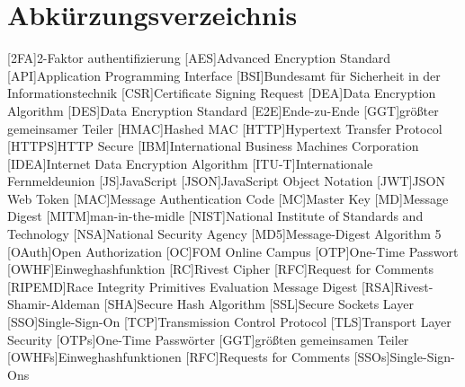 \section*{Abkürzungsverzeichnis}


\begin{acronym}
	[HTTPS]\itemsep0pt %
    [2FA]{2-Faktor \gls{authentifizierung}}
    [AES]{Advanced Encryption Standard}
    [API]{Application Programming Interface}
    [BSI]{Bundesamt für Sicherheit in der Informationstechnik}
    [CSR]{Certificate Signing Request}
    [DEA]{Data Encryption Algorithm}
    [DES]{Data Encryption Standard}
    [E2E]{Ende-zu-Ende}
    [GGT]{größter gemeinsamer Teiler}
    [H\acs{MAC}]{Hashed \acl{MAC}}
    [HTTP]{Hypertext Transfer Protocol}\label{acro:HTTP}
    [\acs{HTTP}S]{\acl{HTTP} Secure}
    [IBM]{International Business Machines Corporation}
    [IDEA]{Internet Data Encryption Algorithm}
    [ITU-T]{Internationale Fernmeldeunion}
    [JS]{JavaScript}
    [JSON]{JavaScript Object Notation}\label{acro:JSON}
    [JWT]{\acs{JSON} Web Token}
    [MAC]{Message Authentication Code}\label{acro:MAC}
    [MC]{Master Key}
    [MD]{Message Digest}
    [MITM]{man-in-the-midle}\label{acro:MITM}
    [NIST]{National Institute of Standards and Technology}
    [NSA]{National Security Agency}
    [MD5]{Message-Digest Algorithm 5}\label{acro:MD5}
    [OAuth]{Open Authorization}
    [OC]{FOM Online Campus} 
    [OTP]{One-Time Passwort}
    [OWHF]{Einweghashfunktion}
    [RC]{Rivest Cipher}
    [RFC]{Request for Comments}
    [RIPEMD]{Race Integrity Primitives Evaluation Message Digest}
    [RSA]{Rivest-Shamir-Aldeman}
    [SHA]{Secure Hash Algorithm}
    [SSL]{Secure Sockets Layer}
    [SSO]{Single-Sign-On}
    [TCP]{Transmission Control Protocol}
    [TLS]{Transport Layer Security}
    [OTPs]{One-Time Passwörter}
    [GGT]{größten gemeinsamen Teiler}
    [OWHFs]{Einweghashfunktionen}
    [RFC]{Requests for Comments}
    [SSOs]{Single-Sign-Ons}
\end{acronym}